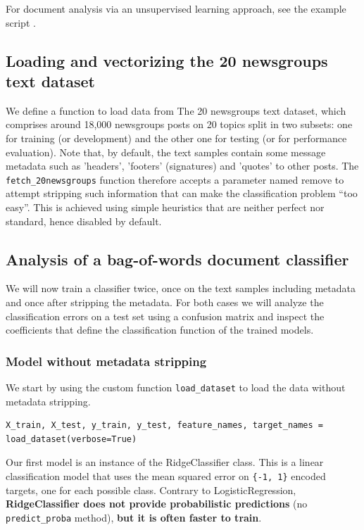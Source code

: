 For document analysis via an unsupervised learning approach, see the example script .

\subsection{Loading and vectorizing the 20 newsgroups text dataset\label{Loading and vectorizing the 20 newsgroups text dataset}}

We define a function to load data from The 20 newsgroups text dataset, which comprises around 18,000 newsgroups posts on 20 topics split in two subsets: one for training (or development) and the other one for testing (or for performance evaluation). Note that, by default, the text samples contain some message metadata such as 'headers', 'footers' (signatures) and 'quotes' to other posts. The \verb|fetch_20newsgroups| function therefore accepts a parameter named remove to attempt stripping such information that can make the classification problem “too easy”. This is achieved using simple heuristics that are neither perfect nor standard, hence disabled by default.
\begin{py}{}

\end{py}


\subsection{Analysis of a bag-of-words document classifier}
We will now train a classifier twice, once on the text samples including metadata and once after stripping the metadata. For both cases we will analyze the classification errors on a test set using a confusion matrix and inspect the coefficients that define the classification function of the trained models.
\subsubsection{Model without metadata stripping}
We start by using the custom function \verb|load_dataset| to load the data without metadata stripping.
\begin{verbatim}
X_train, X_test, y_train, y_test, feature_names, target_names = load_dataset(verbose=True)
\end{verbatim}
Our first model is an instance of the RidgeClassifier class. This is a linear classification model that uses the mean squared error on \verb|{-1, 1}| encoded targets, one for each possible class. Contrary to LogisticRegression, \textbf{RidgeClassifier does not provide probabilistic predictions} (no \verb|predict_proba| method), \textbf{but it is often faster to train}.

